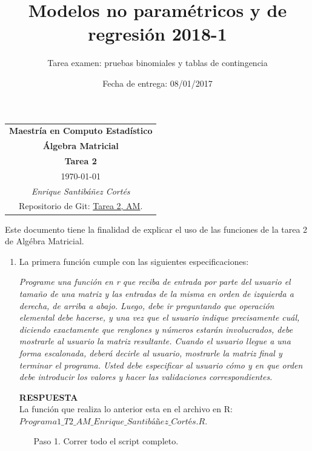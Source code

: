 \documentclass[11pt,letterpaper]{article}
\title{Modelos no paramétricos y de regresión 2018-1}
\author{Tarea examen: pruebas binomiales y tablas de contingencia}
\date{Fecha de entrega: 08/01/2017}
\newcommand{\res}{\textbf{RESPUESTA}\\}
\begin{document}
\begin{table}[ht]
\centering
\begin{tabular}{c}
\textbf{Maestría en Computo Estadístico}\\
\textbf{Álgebra Matricial} \\
\textbf{Tarea 2}\\
\today \\
\emph{Enrique Santibáñez Cortés}\\
Repositorio de Git: \href{https://github.com/Enriquesec/Algebra_matricial/tree/master/tareas/Tarea_2/}{Tarea 2, AM}.
\end{tabular}
\end{table}
Este documento tiene la finalidad de explicar el uso de las funciones de la tarea 2 de Algébra Matricial. 

\begin{enumerate}
\item La primera función cumple con las siguientes especificaciones:

\textit{Programe una función en r que reciba de entrada por parte del usuario el tamaño de una matriz y las entradas de la misma en orden de izquierda a derecha, de arriba a abajo. Luego, debe ir preguntando que operación elemental debe hacerse, y una vez que el usuario indique precisamente cuál, diciendo exactamente que renglones y números estarán involucrados, debe mostrarle al usuario la matriz resultante.  Cuando el usuario llegue a una forma escalonada, deberá decirle al usuario, mostrarle la matriz final y terminar el programa. Usted debe especificar al usuario cómo y en que orden debe introducir los valores y hacer las validaciones correspondientes.
}

\res
La función que realiza lo anterior esta en el archivo en R: \\$Programa1\_T2\_AM\_Enrique\_Santibáñez\_Cortés.R$.
\begin{itemize}
\item[Paso 1.] Correr todo el script completo.


\end{itemize}
\end{enumerate}
\end{document}
